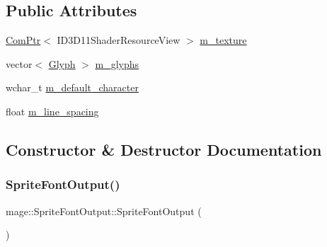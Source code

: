 \subsection*{Public Attributes}
\begin{DoxyCompactItemize}
\item 
\hyperlink{namespacemage_ae74f374780900893caa5555d1031fd79}{Com\+Ptr}$<$ I\+D3\+D11\+Shader\+Resource\+View $>$ \hyperlink{structmage_1_1_sprite_font_output_a3e2f3b44decf05bc81ce91f4bf9ad092}{m\+\_\+texture}
\item 
vector$<$ \hyperlink{structmage_1_1_glyph}{Glyph} $>$ \hyperlink{structmage_1_1_sprite_font_output_aee63c847a919bce662dee371594607dd}{m\+\_\+glyphs}
\item 
wchar\+\_\+t \hyperlink{structmage_1_1_sprite_font_output_a137cca7a8a91c623272b345e9931ca80}{m\+\_\+default\+\_\+character}
\item 
float \hyperlink{structmage_1_1_sprite_font_output_adc36a5113ca2473efbc3aa7989606f28}{m\+\_\+line\+\_\+spacing}
\end{DoxyCompactItemize}


\subsection{Constructor \& Destructor Documentation}
\hypertarget{structmage_1_1_sprite_font_output_a91ed0cd4cb7f9bfab57ff0e3fa4436bc}{}\label{structmage_1_1_sprite_font_output_a91ed0cd4cb7f9bfab57ff0e3fa4436bc} 
\subsubsection{\texorpdfstring{Sprite\+Font\+Output()}{SpriteFontOutput()}\hspace{0.1cm}{\footnotesize\ttfamily [1/3]}}
{\footnotesize\ttfamily mage\+::\+Sprite\+Font\+Output\+::\+Sprite\+Font\+Output (\begin{DoxyParamCaption}{ }\end{DoxyParamCaption})\hspace{0.3cm}{\ttfamily [default]}}

\hypertarget{structmage_1_1_sprite_font_output_a02ea4f9574bce22b4f0f32b78b6b3b79}{}\label{structmage_1_1_sprite_font_output_a02ea4f9574bce22b4f0f32b78b6b3b79} 
